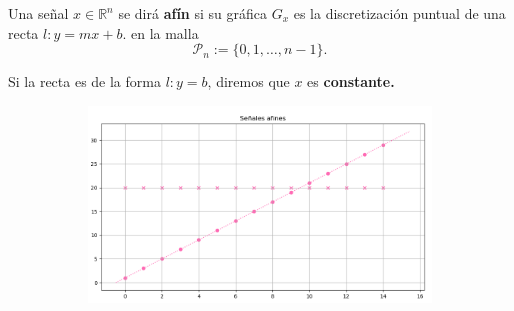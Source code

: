 \documentclass[]{beamer}
\theoremstyle{definition}
\newcommand{\IR}{\mathbb{R}}
\newcommand{\cali}[1]{\mathcal{#1}} %
\begin{document}






\begin{frame}
Una señal $x \in \IR^{n}$ se dirá \textbf{afín} si su gráfica
$G_{x}$ es la discretización puntual de una recta 
$l : y = mx + b$.
en la malla
\[
\cali{P}_{n} := \{0, 1, \ldots , n-1 \}.
\]

Si la recta es de la forma $l: y = b$, diremos que $x$ es \textbf{constante.}

\begin{figure}[H]
\centering
	\begin{figure}
		\includegraphics[scale=0.4]{afines}
 	\end{figure}
 \end{figure}


\end{frame}

\end{document}
